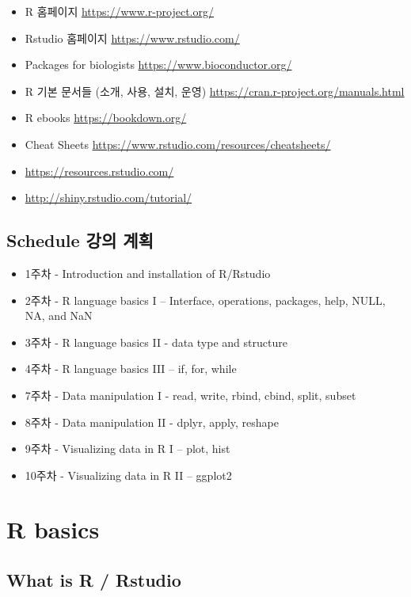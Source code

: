 \documentclass[
]{book}
\providecommand{\tightlist}{%
  \setlength{\itemsep}{0pt}\setlength{\parskip}{0pt}}
\begin{document}
\begin{itemize}
\tightlist
\item
  R 홈페이지 \url{https://www.r-project.org/}
\item
  Rstudio 홈페이지 \url{https://www.rstudio.com/}
\item
  Packages for biologists \url{https://www.bioconductor.org/}
\item
  R 기본 문서들 (소개, 사용, 설치, 운영) \url{https://cran.r-project.org/manuals.html}
\item
  R ebooks \url{https://bookdown.org/}
\item
  Cheat Sheets \url{https://www.rstudio.com/resources/cheatsheets/}
\item
  \url{https://resources.rstudio.com/}
\item
  \url{http://shiny.rstudio.com/tutorial/}
\end{itemize}

\hypertarget{schedule-uxac15uxc758-uxacc4uxd68d}{%
\section{Schedule 강의 계획}\label{schedule-uxac15uxc758-uxacc4uxd68d}}

\begin{itemize}
\tightlist
\item
  1주차 - Introduction and installation of R/Rstudio
\item
  2주차 - R language basics I -- Interface, operations, packages, help, NULL, NA, and NaN
\item
  3주차 - R language basics II - data type and structure
\item
  4주차 - R language basics III -- if, for, while
\item
  7주차 - Data manipulation I - read, write, rbind, cbind, split, subset
\item
  8주차 - Data manipulation II - dplyr, apply, reshape
\item
  9주차 - Visualizing data in R I -- plot, hist
\item
  10주차 - Visualizing data in R II -- ggplot2
\end{itemize}

\hypertarget{r-basics}{%
\chapter{R basics}\label{r-basics}}

\hypertarget{what-is-r-rstudio}{%
\section{What is R / Rstudio}\label{what-is-r-rstudio}}
\end{document}
